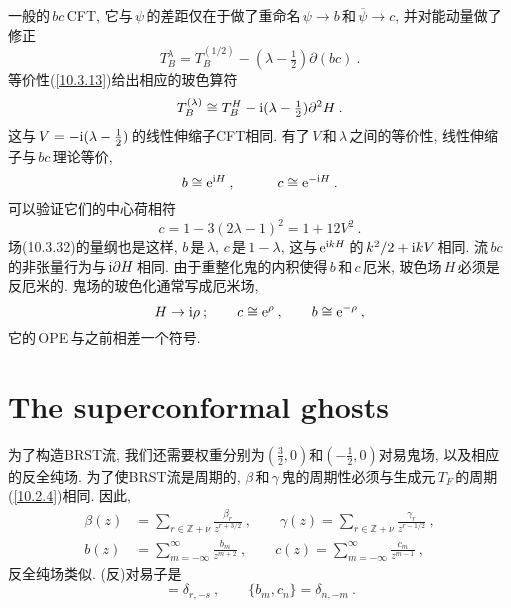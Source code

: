 一般的$\,bc\,$CFT, 它与$\,\psi\,$的差距仅在于做了重命名$\,\psi\to b\,$和$\,\overline{\psi}\to c$, 并对能动量做了修正
\begin{equation}
    T_{B}^{\lambda} = T_{B}^{(1/2)} - (\lambda -\tfrac{1}{2})\partial(bc) \:. \label{10.3.30}
\end{equation}
等价性(\ref{10.3.13})给出相应的玻色算符
\begin{equation}
    T_{B}^{(\lambda)} \cong T_{B}^{H} -\mathrm{i} (\lambda-\tfrac{1}{2})\partial^{2}H\:. \label{10.3.31}
\end{equation}
这与$\,V=-\mathrm{i}(\lambda-\tfrac{1}{2})\,$的线性伸缩子CFT相同. 有了$\,V\,$和$\,\lambda\,$之间的等价性, 线性伸缩子与$\,bc\,$理论等价,
\begin{equation}
    b\cong \mathrm{e}^{\mathrm{i} H} \:, \qquad \quad c\cong\mathrm{e}^{-\mathrm{i} H} \:. \label{10.3.32}
\end{equation}
可以验证它们的中心荷相符
\begin{equation}
    c=1-3(2\lambda-1)^{2}=1+12V^{2}\:. \label{10.3.33}
\end{equation}
场(10.3.32)的量纲也是这样, $b\,$是$\,\lambda$, $c\,$是$\,1-\lambda$, 这与$\,\mathrm{e}^{\mathrm{i} kH}\,$的$\,k^{2}/2+\mathrm{i} kV\,$相同. 流$\,bc\,$的非张量行为与$\,\mathrm{i}\partial H\,$相同. 由于重整化鬼的内积使得$\,b\,$和$\,c\,$厄米, 玻色场$\,H\,$必须是反厄米的. 鬼场的玻色化通常写成厄米场,
\begin{equation}
    H\to \mathrm{i}\rho \: ; \qquad c \cong \mathrm{e}^{\rho} \:, \qquad b\cong \mathrm{e}^{-\rho} \:,\label{10.3.34}
\end{equation}
它的\,OPE\,与之前相差一个符号.

\section{The superconformal ghosts}

为了构造BRST流, 我们还需要权重分别为$(\frac{3}{2},0)$和$(-\frac{1}{2},0)$对易鬼场, 以及相应的反全纯场. 为了使BRST流是周期的, $\beta\,$和$\,\gamma\,$鬼的周期性必须与生成元$\,T_{F}\,$的周期(\ref{10.2.4})相同. 因此,
\begin{subequations}
\begin{align}
    \beta(z)&=\sum_{r\in \mathds{Z}+\nu}\frac{\beta_{r}}{z^{r+3/2}}\:, \qquad 
    \gamma(z)=\sum_{r\in \mathds{Z}+\nu}\frac{\gamma_{r}}{z^{r-1/2}}\:, \label{10.4.1a} \\
    b(z)&=\sum_{m=-\infty}^{\infty}\frac{b_{m}}{z^{m+2}} \:, \qquad 
    c(z)=\sum_{m=-\infty}^{\infty}\frac{c_{m}}{z^{m-1}} \:,  \label{10.4.1b}
\end{align} \label{10.4.1}
\end{subequations}
反全纯场类似. (反)对易子是
\begin{equation}
    [\gamma_{r},\beta_{s}] =\delta_{r,-s} \:, \qquad \{b_{m},c_{n}\}=\delta_{n,-m} \:. \label{10.4.2}
\end{equation}


